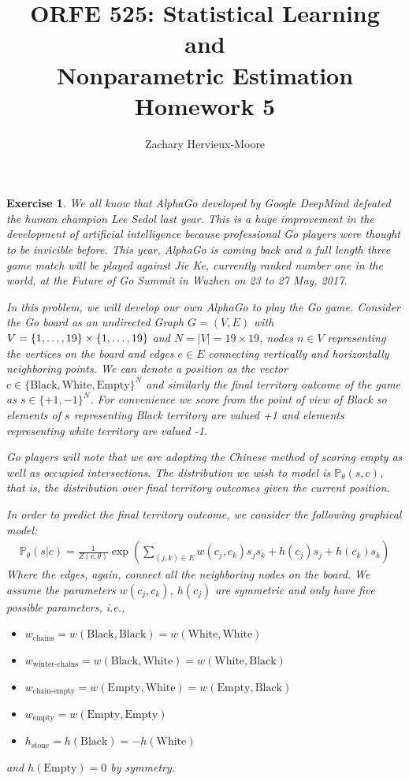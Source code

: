 \documentclass[12pt]{article}
\title{ORFE 525: Statistical Learning and \\ Nonparametric Estimation \\ Homework 5}
\author{Zachary Hervieux-Moore}
\date{\displaydate{date}}
\theoremstyle{colon}
\newtheorem{exercise}{Exercise}
\begin{document}
\maketitle

\clearpage

\begin{exercise}
  We all know that AlphaGo developed by Google DeepMind defeated the human champion Lee Sedol last year. This is a huge improvement in the development of artificial intelligence because professional Go players were thought to be invicible before. This year, AlphaGo is coming back and a full length three game match will be played against Jie Ke, currently ranked number one in the world, at the Future of Go Summit in Wuzhen on 23 to 27 May, 2017.

  In this problem, we will develop our own AlphaGo to play the Go game. Consider the Go board as an undirected Graph $G = (V,E)$ with $V=\{1,\mathellipsis,19\} \times \{1, \mathellipsis,19\}$ and $N = \lvert V \rvert = 19 \times 19$, nodes $n \in V$ representing the vertices on the board and edges $e \in E$ connecting vertically and horizontally neighboring points. We can denote a position as the vector $c \in \{\text{Black}, \text{White}, \text{Empty}\}^N$ and similarly the final territory outcome of the game as $s \in \{+1, -1\}^N$. For convenience we score from the point of view of Black so elements of $s$ representing Black territory are valued +1 and elements representing white territory are valued -1.

  Go players will note that we are adopting the Chinese method of scoring empty as well as occupied intersections. The distribution we wish to model is $\mathbb{P}_\theta(s,c)$, that is, the distribution over final territory outcomes given the current position.

  In order to predict the final territory outcome, we consider the following graphical model:
  \begin{gather*}
    \mathbb{P}_\theta(s | c) = \frac{1}{Z(c,\theta)} \exp \left( \sum_{(j,k) \in E} w(c_j, c_k) s_j s_k + h(c_j) s_j + h(c_k) s_k \right)
  \end{gather*}
  Where the edges, again, connect all the neighboring nodes on the board. We assume the parameters $w(c_j, c_k)$, $h(c_j)$ are symmetric and only have five possible parameters, i.e.,
  \begin{itemize}
    \item $w_{\text{chains}} = w(\text{Black}, \text{Black}) = w(\text{White}, \text{White})$
    \item $w_{\text{winter-chains}} = w(\text{Black}, \text{White}) = w(\text{White}, \text{Black})$
    \item $w_{\text{chain-empty}} = w(\text{Empty}, \text{White}) = w(\text{Empty}, \text{Black})$
    \item $w_{\text{empty}} = w(\text{Empty}, \text{Empty})$
    \item $h_{\text{stone}} = h(\text{Black}) = -h(\text{White})$
  \end{itemize}
  and $h(\text{Empty}) = 0$ by symmetry.


\end{exercise}
\end{document}
